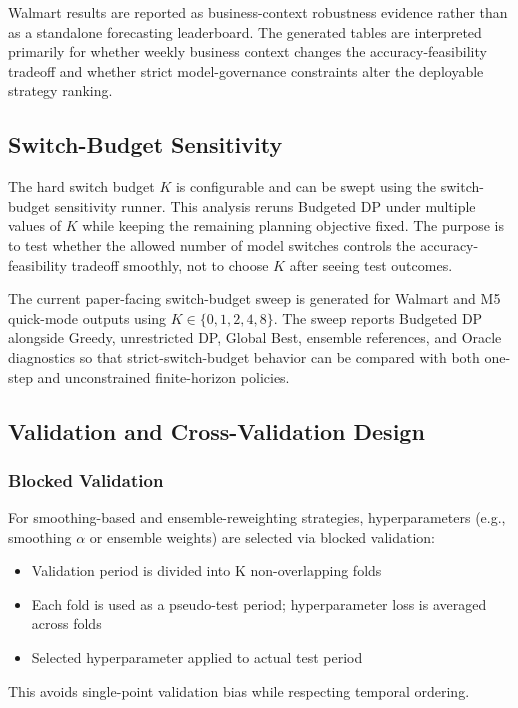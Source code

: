 Walmart results are reported as business-context robustness evidence rather than as a standalone forecasting leaderboard. The generated tables are interpreted primarily for whether weekly business context changes the accuracy-feasibility tradeoff and whether strict model-governance constraints alter the deployable strategy ranking.

\subsection{Switch-Budget Sensitivity}

The hard switch budget $K$ is configurable and can be swept using the switch-budget sensitivity runner. This analysis reruns Budgeted DP under multiple values of $K$ while keeping the remaining planning objective fixed. The purpose is to test whether the allowed number of model switches controls the accuracy-feasibility tradeoff smoothly, not to choose $K$ after seeing test outcomes.

The current paper-facing switch-budget sweep is generated for Walmart and M5 quick-mode outputs using $K \in \{0,1,2,4,8\}$. The sweep reports Budgeted DP alongside Greedy, unrestricted DP, Global Best, ensemble references, and Oracle diagnostics so that strict-switch-budget behavior can be compared with both one-step and unconstrained finite-horizon policies.

\subsection{Validation and Cross-Validation Design}

\subsubsection{Blocked Validation}

For smoothing-based and ensemble-reweighting strategies, hyperparameters (e.g., smoothing $\alpha$ or ensemble weights) are selected via blocked validation:
\begin{itemize}
    \item Validation period is divided into K non-overlapping folds
    \item Each fold is used as a pseudo-test period; hyperparameter loss is averaged across folds
    \item Selected hyperparameter applied to actual test period
\end{itemize}

This avoids single-point validation bias while respecting temporal ordering.


